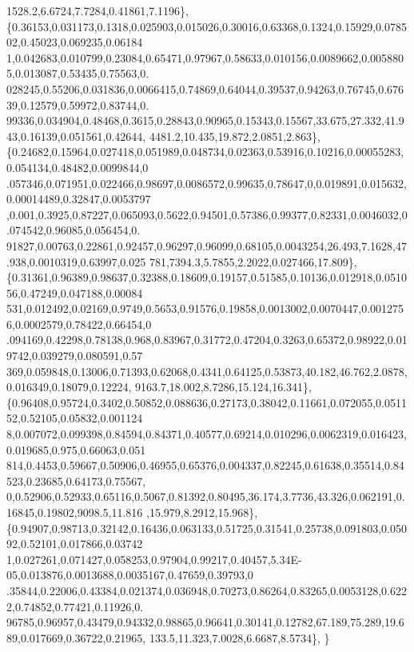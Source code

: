 \begin{DoxyCode}
      1528.2,6.6724,7.7284,0.41861,7.1196\},
\{0.36153,0.031173,0.1318,0.025903,0.015026,0.30016,0.63368,0.1324,0.15929,0.078502,0.45023,0.069235,0.06184
      1,0.042683,0.010799,0.23084,0.65471,0.97967,0.58633,0.010156,0.0089662,0.0058805,0.013087,0.53435,0.75563,0.
      028245,0.55206,0.031836,0.0066415,0.74869,0.64044,0.39537,0.94263,0.76745,0.67639,0.12579,0.59972,0.83744,0.
      99336,0.034904,0.48468,0.3615,0.28843,0.90965,0.15343,0.15567,33.675,27.332,41.943,0.16139,0.051561,0.42644,
      4481.2,10.435,19.872,2.0851,2.863\},
\{0.24682,0.15964,0.027418,0.051989,0.048734,0.02363,0.53916,0.10216,0.00055283,0.054134,0.48482,0.0099844,0
      .057346,0.071951,0.022466,0.98697,0.0086572,0.99635,0.78647,0,0.019891,0.015632,0.00014489,0.32847,0.0053797
      ,0.001,0.3925,0.87227,0.065093,0.5622,0.94501,0.57386,0.99377,0.82331,0.0046032,0.074542,0.96085,0.056454,0.
      91827,0.00763,0.22861,0.92457,0.96297,0.96099,0.68105,0.0043254,26.493,7.1628,47.938,0.0010319,0.63997,0.025
      781,7394.3,5.7855,2.2022,0.027466,17.809\},
\{0.31361,0.96389,0.98637,0.32388,0.18609,0.19157,0.51585,0.10136,0.012918,0.051056,0.47249,0.047188,0.00084
      531,0.012492,0.02169,0.9749,0.5653,0.91576,0.19858,0.0013002,0.0070447,0.0012756,0.0002579,0.78422,0.66454,0
      .094169,0.42298,0.78138,0.968,0.83967,0.31772,0.47204,0.3263,0.65372,0.98922,0.019742,0.039279,0.080591,0.57
      369,0.059848,0.13006,0.71393,0.62068,0.4341,0.64125,0.53873,40.182,46.762,2.0878,0.016349,0.18079,0.12224,
      9163.7,18.002,8.7286,15.124,16.341\},
\{0.96408,0.95724,0.3402,0.50852,0.088636,0.27173,0.38042,0.11661,0.072055,0.051152,0.52105,0.05832,0.001124
      8,0.007072,0.099398,0.84594,0.84371,0.40577,0.69214,0.010296,0.0062319,0.016423,0.019685,0.975,0.66063,0.051
      814,0.4453,0.59667,0.50906,0.46955,0.65376,0.004337,0.82245,0.61638,0.35514,0.84523,0.23685,0.64173,0.75567,
      0,0.52906,0.52933,0.65116,0.5067,0.81392,0.80495,36.174,3.7736,43.326,0.062191,0.16845,0.19802,9098.5,11.816
      ,15.979,8.2912,15.968\},
\{0.94907,0.98713,0.32142,0.16436,0.063133,0.51725,0.31541,0.25738,0.091803,0.05092,0.52101,0.017866,0.03742
      1,0.027261,0.071427,0.058253,0.97904,0.99217,0.40457,5.34E-05,0.013876,0.0013688,0.0035167,0.47659,0.39793,0
      .35844,0.22006,0.43384,0.021374,0.036948,0.70273,0.86264,0.83265,0.0053128,0.6222,0.74852,0.77421,0.11926,0.
      96785,0.96957,0.43479,0.94332,0.98865,0.96641,0.30141,0.12782,67.189,75.289,19.689,0.017669,0.36722,0.21965,
      133.5,11.323,7.0028,6.6687,8.5734\},
\}
\end{DoxyCode}
\mbox{\label{classSolutions_a1d52637d01c7e17fcc05a918375a7728}} 
